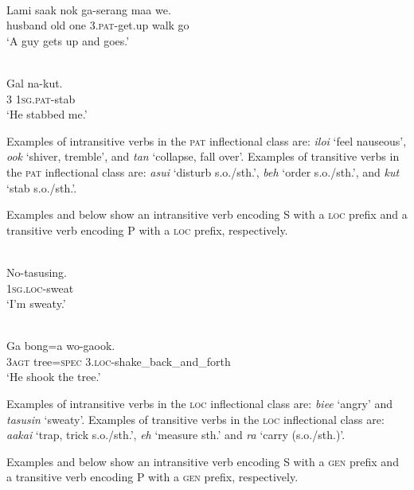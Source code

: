 \ea%
\label{bkm:Ref324337569}
 \\ 
\gll    Lami  saak  nok  ga-serang  maa  we.\\  
    husband  old  one  3.\textsc{pat}{}-get.up  walk  go  \\
\glt  `A guy gets up and goes.'
\z


\ea%
\label{bkm:Ref324338165}
 \\ 
\gll   Gal  na-kut.     \\  
   3  1\textsc{sg.pat-}stab     \\
\glt `He stabbed me.'
\z

Examples of intransitive verbs in the \textsc{pat} inflectional class are: \textit{iloi} `feel nauseous', \textit{ook} `shiver, tremble', and \textit{tan} `collapse, fall over'. Examples of transitive verbs in the \textsc{pat} inflectional class are: \textit{asui} `disturb s.o./sth.', \textit{beh} `order s.o./sth.', and \textit{kut} `stab s.o./sth.'.

Examples  and  below show an intransitive verb encoding S with a \textsc{loc} prefix and a transitive verb encoding P with a \textsc{loc} prefix, respectively.


\ea%
\label{bkm:Ref324338359}
 \\ 
\gll    No-tasusing.   \\  
    \textsc{1sg.loc}{}-sweat   \\
\glt  `I'm sweaty.'
\z


\ea 
\label{ex:10:1238}
 \\ 
 \gll    Ga  bong=a  wo-gaook.  \\
 \textsc{3agt} tree=\textsc{spec} 3.\textsc{loc}{}-shake\_back\_and\_forth     \\
 \glt  `He shook the tree.'
\z



Examples of intransitive verbs in the \textsc{loc} inflectional class are: \textit{biee} `angry' and \textit{tasusin} `sweaty'. Examples of transitive verbs in the \textsc{loc} inflectional class are: \textit{aakai} `trap, trick s.o./sth.', \textit{eh} `measure sth.' and \textit{ra} `carry (s.o./sth.)'.

Examples  and  below show an intransitive verb encoding S with a \textsc{gen} prefix and a transitive verb encoding P with a \textsc{gen} prefix, respectively.


